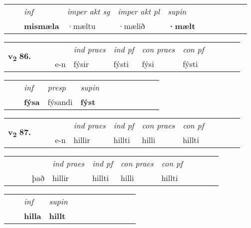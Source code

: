 \begin{tabular}{llllllllllll}
 & & \textit{inf} & \textit{imper akt sg} & \textit{imper akt pl}    & \textit{supin}       \\*
  & & \textbf{mismæla} & ·mæltu  & ·mælið    &  \textbf{·mælt}   \\*
\cmidrule{1-12}
\end{tabular}





\begin{tabular}{llllllllllll}\toprule
\multirow{4}{*}{{{\textbf{v{\textsubscript{2}}} \Large{\textbf{86.}}}}}  & &  & &  \textit{ind praes} & \textit{ind pf} & \textit{con praes} & \textit{con pf} \\*
&  & & e-n & fýsir & fýsti & fýsi & fýsti \\*
\cmidrule{5-9}
\end{tabular}


\begin{tabular}{llllllllllll}
 & & \textit{inf}     & \textit{presp} & \textit{supin}       \\*
  & & \textbf{fýsa}      & fýsandi &  \textbf{fýst}   \\*
\cmidrule{1-12}
\end{tabular}





\begin{tabular}{llllllllllll}\toprule
\multirow{4}{*}{{{\textbf{v{\textsubscript{2}}} \Large{\textbf{87.}}}}}  & &  & &  \textit{ind praes} & \textit{ind pf} & \textit{con praes} & \textit{con pf} \\*
&  & & e-n & hillir & hillti & hilli & hillti \\*
\cmidrule{5-9}
\end{tabular}


\begin{tabular}{llllllllllll}
 & &  & &  \textit{ind praes} & \textit{ind pf} & \textit{con praes} & \textit{con pf} \\*
&  & & það & hillir & hillti & hilli & hillti \\*
\cmidrule{5-9}
\end{tabular}


\begin{tabular}{llllllllllll}
 & & \textit{inf}      & \textit{supin}       \\*
  & & \textbf{hilla}       &  \textbf{hillt}   \\*
\cmidrule{1-12}
\end{tabular}





